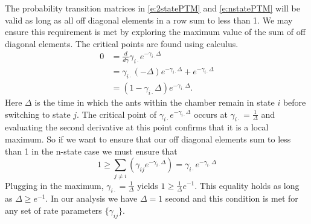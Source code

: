 \documentclass[cmbright,fleqn,referee]{envauth}
\begin{document}
The probability transition matrices in \eqref{e:2statePTM} and \eqref{e:nstatePTM} will be valid as long as all off diagonal elements in a row sum to less than 1. We may ensure this requirement is met by exploring the maximum value of the sum of off diagonal elements. The critical points are found using calculus.  
% 
\begin{align}
0 &= \frac{d}{d\gamma} \gamma_{i\cdot} e^{-\gamma_{i\cdot}\Delta}\\
&=\gamma_{i\cdot}(-\Delta)e^{-\gamma_{i\cdot}\Delta} + e^{-\gamma_{i\cdot}\Delta}\\
&= (1 - \gamma_{i\cdot}\Delta)e^{-\gamma_{i\cdot}\Delta}.
\end{align}
Here $\Delta$ is the time in which the ants within the chamber remain in state $i$ before switching to state $j$. The critical point of $\gamma_{i\cdot} e^{-\gamma_{i\cdot}\Delta}$ occurs at $\gamma_{i\cdot} = \frac{1}{\Delta}$ and evaluating the second derivative at this point confirms that it is a local maximum. So if we want to ensure that our off diagonal elements sum to less than 1 in the n-state case we must ensure that
% 
\begin{equation}
1 \geq \sum_{j \neq i}\left(\gamma_{ij}e^{-\gamma_{i\cdot}\Delta} \right) = \gamma_{i\cdot}e^{-\gamma_{i\cdot}\Delta}
\end{equation}
        Plugging in the maximum, $\gamma_{i\cdot} = \frac{1}{\Delta}$ yields $1 \geq \frac{1}{\Delta}e^{-1}$. This equality holds as long as $\Delta \geq e^{-1}$. In our analysis we have $\Delta = 1$ second and this condition is met for any set of rate parameters $\{\gamma_{ij}\}$. 
% 
% 
\end{document}
